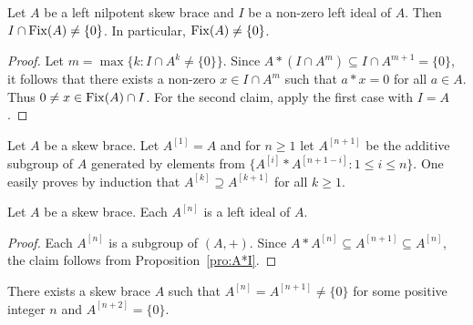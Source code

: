 \begin{proposition}
    \label{pro:IcapFix}
    Let $A$ be a left nilpotent skew brace and $I$ be a non-zero left ideal of
    $A$. Then $I\cap\operatorname{Fix}(A)\ne\{0\}$. In particular, $\operatorname{Fix}(A)\ne\{0\}$. 
\end{proposition}

\begin{proof}
    Let $m=\max\{k:I\cap A^k\ne\{0\}\}$. Since
    $A*(I\cap A^m)\subseteq I\cap A^{m+1}=\{0\}$,
    it follows that there exists a non-zero $x\in I\cap A^m$ such that $a*x=0$
    for all $a\in A$. Thus $0\ne x\in\operatorname{Fix}(A)\cap I$.
    For the second claim, apply the first case with $I=A$.
\end{proof}

Let $A$ be a skew brace.
Let $A^{[1]}=A$ and for $n\geq 1$ let $A^{[n+1]}$ be the
additive subgroup of $A$ generated by elements from
$\{A^{[i]}*A^{[n+1-i]}:1\leq i\leq n\}$.
One easily proves by induction that $A^{[k]}\supseteq
A^{[k+1]}$ for all $k\geq1$. 

\begin{proposition}
    \label{pro:Smoktunowicz}
    Let $A$ be a skew brace. Each $A^{[n]}$ is a left ideal of $A$.
\end{proposition}

\begin{proof}
    Each $A^{[n]}$ is a subgroup of $(A,+)$. Since
    $A*A^{[n]}\subseteq A^{[n+1]}\subseteq A^{[n]}$, the claim follows from
    Proposition~\ref{pro:A*I}.
\end{proof}

There exists a skew brace $A$ such that $A^{[n]}=A^{[n+1]}\ne\{0\}$
for some positive integer $n$ and $A^{[n+2]}=\{0\}$.

